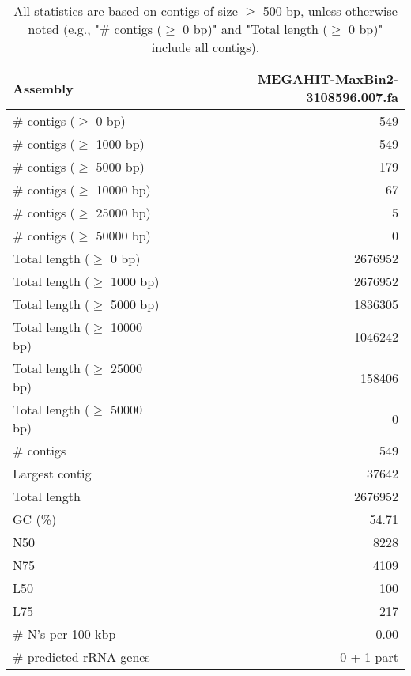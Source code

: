 \documentclass[12pt,a4paper]{article}
\begin{document}
\begin{table}[ht]
\begin{center}
\caption{All statistics are based on contigs of size $\geq$ 500 bp, unless otherwise noted (e.g., "\# contigs ($\geq$ 0 bp)" and "Total length ($\geq$ 0 bp)" include all contigs).}
\begin{tabular}{|l*{1}{|r}|}
\hline
Assembly & MEGAHIT-MaxBin2-3108596.007.fa \\ \hline
\# contigs ($\geq$ 0 bp) & 549 \\ \hline
\# contigs ($\geq$ 1000 bp) & 549 \\ \hline
\# contigs ($\geq$ 5000 bp) & 179 \\ \hline
\# contigs ($\geq$ 10000 bp) & 67 \\ \hline
\# contigs ($\geq$ 25000 bp) & 5 \\ \hline
\# contigs ($\geq$ 50000 bp) & 0 \\ \hline
Total length ($\geq$ 0 bp) & 2676952 \\ \hline
Total length ($\geq$ 1000 bp) & 2676952 \\ \hline
Total length ($\geq$ 5000 bp) & 1836305 \\ \hline
Total length ($\geq$ 10000 bp) & 1046242 \\ \hline
Total length ($\geq$ 25000 bp) & 158406 \\ \hline
Total length ($\geq$ 50000 bp) & 0 \\ \hline
\# contigs & 549 \\ \hline
Largest contig & 37642 \\ \hline
Total length & 2676952 \\ \hline
GC (\%) & 54.71 \\ \hline
N50 & 8228 \\ \hline
N75 & 4109 \\ \hline
L50 & 100 \\ \hline
L75 & 217 \\ \hline
\# N's per 100 kbp & 0.00 \\ \hline
\# predicted rRNA genes & 0 + 1 part \\ \hline
\end{tabular}
\end{center}
\end{table}
\end{document}
